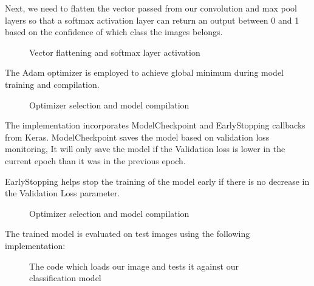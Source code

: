 \documentclass[conference]{IEEEtran}
\begin{document}
\hfill \break
\hfill \break
\hfill \break
\hfill \break
Next, we need to flatten the vector passed from our convolution and max pool layers so that a softmax activation layer can return an output between 0 and 1 based on the confidence of which class the images belongs.

\begin{figure}[htbp]
    \centering
    \caption{Vector flattening and softmax layer activation}
    \label{fig:1.3}
\end{figure}
\FloatBarrier 

The Adam optimizer is employed to achieve global minimum during model training and compilation.

\begin{figure}[htbp]
    \centering
    \caption{Optimizer selection and model compilation}
    \label{fig:1.4}
\end{figure}
\FloatBarrier 

The implementation incorporates ModelCheckpoint and EarlyStopping callbacks from Keras. ModelCheckpoint saves the model based on validation loss monitoring, It will only save the model if the Validation loss is lower in the current epoch than it was in the previous epoch.

EarlyStopping helps stop the training of the model early if there is no decrease in the Validation Loss parameter.

\begin{figure}[htbp]
    \centering
    \caption{Optimizer selection and model compilation}
    \label{fig:1.4}
\end{figure}
\FloatBarrier 

\hfill \break
\hfill \break
\hfill \break
\hfill \break
\hfill \break
\hfill \break
\hfill \break
\hfill \break
\hfill \break
\hfill \break
The trained model is evaluated on test images using the following implementation:
\begin{figure}[htbp]
    \centering
    \caption{The code which loads our image and tests it against our classification model}
    \label{fig:1.4}
\end{figure}
\FloatBarrier 
\end{document}
